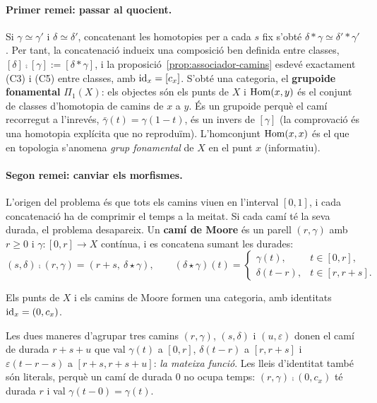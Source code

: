 \paragraph{Primer remei: passar al quocient.} Si $\gamma\simeq\gamma'$ i $\delta\simeq\delta'$, concatenant les homotopies per a cada $s$ fix s'obté $\delta\ast\gamma\simeq\delta'\ast\gamma'$. Per tant, la concatenació indueix una composició ben definida entre classes, $[\delta]\comp[\gamma]:=[\delta\ast\gamma]$, i la proposició~\ref{prop:associador-camins} esdevé exactament (C3) i (C5) entre classes, amb $\operatorname{id}_x=[c_x]$. S'obté una categoria, el \textbf{grupoide fonamental} $\Pi_1(X)$: els objectes són els punts de $X$ i $\operatorname{Hom}(x,y)$ és el conjunt de classes d'homotopia de camins de $x$ a $y$. És un grupoide perquè el camí recorregut a l'inrevés, $\bar\gamma(t)=\gamma(1-t)$, és un invers de $[\gamma]$ (la comprovació és una homotopia explícita que no reproduïm). L'homconjunt $\operatorname{Hom}(x,x)$ és el que en topologia s'anomena \emph{grup fonamental} de $X$ en el punt $x$ (informatiu).

\paragraph{Segon remei: canviar els morfismes.} L'origen del problema és que tots els camins viuen en l'interval $[0,1]$, i cada concatenació ha de comprimir el temps a la meitat. Si cada camí té la seva durada, el problema desapareix. Un \textbf{camí de Moore} és un parell $(r,\gamma)$ amb $r\ge0$ i $\gamma\colon[0,r]\to X$ contínua, i es concatena sumant les durades:
\[
(s,\delta)\comp(r,\gamma)=(r+s,\ \delta\star\gamma),\qquad
(\delta\star\gamma)(t)=
\begin{cases}
\gamma(t), & t\in[0,r],\\
\delta(t-r), & t\in[r,r+s].
\end{cases}
\]

\begin{proposicio}
Els punts de $X$ i els camins de Moore formen una categoria, amb identitats $\operatorname{id}_x=(0,c_x)$.
\end{proposicio}

\begin{prova}
Les dues maneres d'agrupar tres camins $(r,\gamma)$, $(s,\delta)$ i $(u,\varepsilon)$ donen el camí de durada $r+s+u$ que val $\gamma(t)$ a $[0,r]$, $\delta(t-r)$ a $[r,r+s]$ i $\varepsilon(t-r-s)$ a $[r+s,r+s+u]$: \emph{la mateixa funció}. Les lleis d'identitat també són literals, perquè un camí de durada $0$ no ocupa temps: $(r,\gamma)\comp(0,c_x)$ té durada $r$ i val $\gamma(t-0)=\gamma(t)$.
\end{prova}

